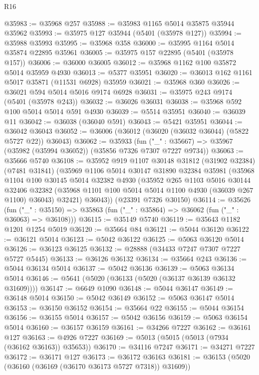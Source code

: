 \begin{lexlean}{R16}
\begin{coremodule}
@35983 := @35968 @257
@35988 := @35983 @1165 @5014 @35875 @35944 @35962
@35993 := @35975 @127 @35944 (@5401 (@35978 @127))
@35994 := @35988 @35993
@35995 := @35968 @358
@36000 := @35995 @1164 @5014 @35874 @22895 @35961
@36005 := @35975 @157 @22895 (@5401 (@35978 @157))
@36006 := @36000 @36005
@36012 := @35968 @1162 @100 @35872 @5014 @35959 @4930
@36013 := @5377 @35951
@36020 := @36013 @162 @1161 @5017 @35871 (@11531 @6928) @35959
@36021 := @35968 @360
@36026 := @36021 @594 @5014 @5016 @9174 @6928
@36031 := @35975 @243 @9174 (@5401 (@35978 @243))
@36032 := @36026 @36031
@36038 := @35968 @592 @100 @5014 @5014 @591 @4930
@36039 := @5514 @35951
@36040 := @36039 @11
@36042 := @36038 (@36040 @591)
@36043 := @5421 @35951
@36044 := @36042 @36043
@36052 := @36006 (@36012 (@36020 (@36032 @36044) (@5822 @5727 @22)) @36043)
@36062 := @35933
    (fun ("_" : @35667) => @35967 (@35982 (@35994 @36052)) (@35856 @7326 @7307 @7227 @9734))
@36063 := @35666 @5740
@36108 := @35952
    @919
    @1107
    @30148
    @31812
    (@31902 @32384)
    (@7481 @31841)
    (@35969
      @1106
      @5014
      @30147
      @31890
      @32384
      @35981
      (@35968
        @1104
        @100
        @30145
        @5014
        @32382
        @4930
        (@35952
          @265
          @1103
          @5016
          @30144
          @32406
          @32382
          (@35968 @1101 @100 @5014 @5014 @1100 @4930 (@36039 @267 @1100) @36043)
          @32421)
        @36043))
    (@23391 @7326 @30150)
@36114 := @35626
    (fun ("_" : @35150) => @35863 (fun ("_" : @35864) => @36062 (fun ("_" : @36063) => @36108)))
@36115 := @35149 @5740
@36119 := @35643 @1182 @1201 @1254 @5019
@36120 := @35664 @84
@36121 := @5044 @36120
@36122 := @36121 @5014
@36123 := @5042 @36122
@36125 := @5063 @36120 @5014
@36126 := @36123 @36125
@36132 := @28888 (@34433 @7247 @7307 @7227 @5727 @5445)
@36133 := @36126 @36132
@36134 := @35664 @243
@36136 := @5044 @36134 @5014
@36137 := @5042 @36136
@36139 := @5063 @36134 @5014
@36146 := @5641 (@5020 (@36133 (@5020 (@36137 @36139 @36132 @31609))))
@36147 := @6649 @1090
@36148 := @5044 @36147
@36149 := @36148 @5014
@36150 := @5042 @36149
@36152 := @5063 @36147 @5014
@36153 := @36150 @36152
@36154 := @35664 @22
@36155 := @5044 @36154
@36156 := @36155 @5014
@36157 := @5042 @36156
@36159 := @5063 @36154 @5014
@36160 := @36157 @36159
@36161 := @34266 @7227
@36162 := @36161 @127
@36163 := @4926 @7227
@36169 := @5013 (@5015 (@5013 (@7934 (@36162 @36163)) @35653))
@36170 := @34116 @7247
@36171 := @34271 @7227
@36172 := @36171 @127
@36173 := @36172 @36163
@36181 := @36153 (@5020 (@36160 (@36169 (@36170 @36173 @5727 @7318)) @31609))

\end{coremodule}
\end{lexlean}
